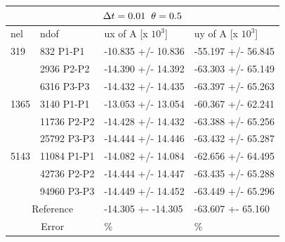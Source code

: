 \begin{table}[h!]
\centering
\label{CSM 3 Results 2}
\begin{tabular}{ |p{1cm}||p{2.7cm}|p{3.3cm}|p{3.3cm}|}
\hline
  \multicolumn{4}{|c|}{$\Delta t = 0.01 \hspace{2mm} \theta = 0.5$} \\
\hline
nel & ndof & ux of A [x $10^{3}$]  &uy of A [x $10^{3}$] \\
\hline
    319     & 832 P1-P1 & -10.835       +/-  10.836 & -55.197       +/-  56.845 \\
     & 2936 P2-P2 & -14.390       +/-  14.392 & -63.303       +/-  65.149 \\
      & 6316 P3-P3& -14.432       +/-  14.435 & -63.397       +/-  65.263 \\
    \hline
    1365    & 3140 P1-P1  & -13.053       +/-  13.054 & -60.367       +/-  62.241 \\
     & 11736 P2-P2  & -14.428       +/-  14.432 & -63.388       +/-  65.256 \\
     & 25792 P3-P3  & -14.444       +/-  14.446 & -63.432       +/-  65.287 \\
     \hline
     5143    & 11084 P1-P1 & -14.082       +/-  14.084 & -62.656       +/-  64.495 \\
     & 42736 P2-P2 & -14.444       +/-  14.447 & -63.435       +/-  65.288 \\
     & 94960 P3-P3& -14.449       +/-  14.452 & -63.449       +/-  65.296 \\
 \hline
  \multicolumn{2}{|c|}{Reference}  &-14.305 +- -14.305        & -63.607 +- 65.160    \\
   \hline
    \multicolumn{2}{|c|}{Error}  & \%   &  \%\\
   \hline
\end{tabular}
\end{table}

\newpage

